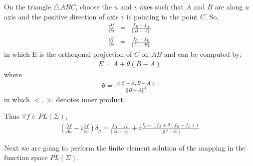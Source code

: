\documentclass{InsightArticle}
\begin{document}
  On the triangle $\triangle ABC$, choose the $u$ and $v$ axes such
  that $A$ and $B$ are along $u$ axis and the positive direction of
  axis $v$ is pointing to the point $C$. So,
  \begin{eqnarray}    
    \frac{\partial f}{\partial u} &=& \frac{f_B - f_A}{||B - A||} \nonumber \\
    \frac{\partial f}{\partial v} &=& \frac{f_C - f_E}{||C - E||} \nonumber
  \end{eqnarray}  
  in which E is the orthogonal projection of $C$ on $AB$ and can be
  computed by:
  \begin{eqnarray}  
    E = A + \theta(B-A) \nonumber
  \end{eqnarray}  
  where
  \begin{eqnarray}  
    \theta = \frac{<C-A, B-A>}{||B-A||^2} \nonumber
  \end{eqnarray}  
  in which $<,>$ denotes inner product.
  
  Thus $\forall f \in PL(\Sigma)$, 
  \begin{eqnarray}  
     (\frac{\partial f}{\partial u} - i\frac{\partial f}{\partial v})\delta_p = 
     \frac{f_A - f_B}{|| B - A ||} + i\frac{f_c-(f_A + \theta(f_B - f_A))}{||C - E||} \label{Rinteqn}
  \end{eqnarray}  
  
  Next we are going to perform the finite element solution of the
  mapping in the function space $PL(\Sigma)$.
  
\end{document}
